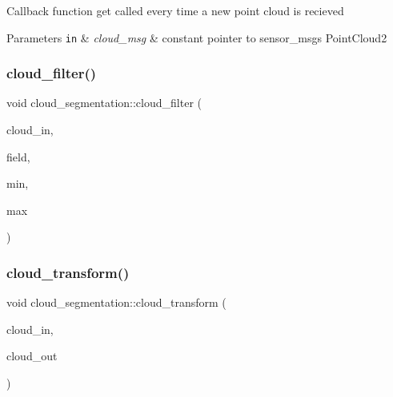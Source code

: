 Callback function get called every time a new point cloud is recieved 
\begin{DoxyParams}[1]{Parameters}
\mbox{\tt in}  & {\em cloud\+\_\+msg} & constant pointer to sensor\+\_\+msgs Point\+Cloud2 \\
\hline
\end{DoxyParams}
\mbox{\label{classdatmo_1_1cloud__segmentation_afa29d45018811393b160e64b1f972289}} 
\subsubsection{\texorpdfstring{cloud\+\_\+filter()}{cloud\_filter()}}
{\footnotesize\ttfamily void cloud\+\_\+segmentation\+::cloud\+\_\+filter (\begin{DoxyParamCaption}\item[{const pcl\+::\+Point\+Cloud$<$ pcl\+::\+Point\+X\+YZ $>$\+::Ptr \&}]{cloud\+\_\+in,  }\item[{const string}]{field,  }\item[{float}]{min,  }\item[{float}]{max }\end{DoxyParamCaption})\hspace{0.3cm}{\ttfamily [private]}}

\mbox{\label{classdatmo_1_1cloud__segmentation_a3e3bd9d1b4a99da4bcd81ebac95f83fe}} 
\subsubsection{\texorpdfstring{cloud\+\_\+transform()}{cloud\_transform()}}
{\footnotesize\ttfamily void cloud\+\_\+segmentation\+::cloud\+\_\+transform (\begin{DoxyParamCaption}\item[{const pcl\+::\+Point\+Cloud$<$ pcl\+::\+Point\+X\+YZ $>$\+::Const\+Ptr \&}]{cloud\+\_\+in,  }\item[{const pcl\+::\+Point\+Cloud$<$ pcl\+::\+Point\+X\+YZ $>$\+::Ptr \&}]{cloud\+\_\+out }\end{DoxyParamCaption})\hspace{0.3cm}{\ttfamily [private]}}

